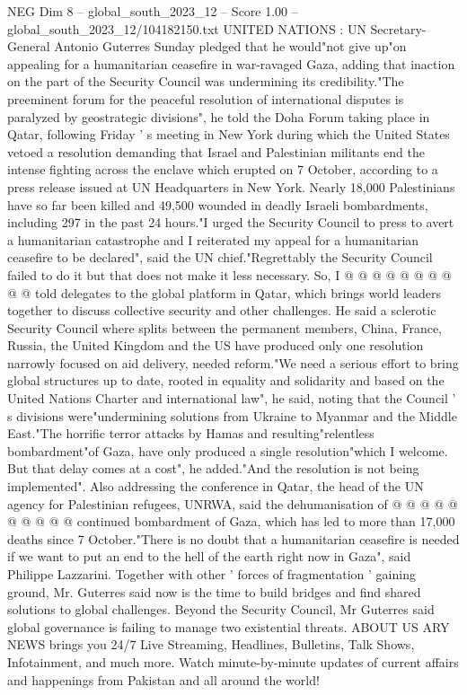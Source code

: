 \begin{textsample}{NEG Dim 8 – global\_south\_2023\_12 – Score 1.00 – global\_south\_2023\_12/104182150.txt}  \label{ex:f8_neg_229}
UNITED NATIONS : UN Secretary-General Antonio Guterres Sunday pledged that he would"not give up"on appealing for a humanitarian ceasefire in war-ravaged Gaza, adding that inaction on the part of the Security Council was undermining its credibility."The preeminent forum for the peaceful resolution of international disputes is paralyzed by geostrategic divisions", he told the Doha Forum taking place in Qatar, following Friday ' s meeting in New York during which the United States vetoed a resolution demanding that Israel and Palestinian militants end the intense fighting across the enclave which erupted on 7 October, according to a press release issued at UN Headquarters in New York.
Nearly 18,000 Palestinians have so far been killed and 49,500 wounded in deadly Israeli bombardments, including 297 in the past 24 hours."I urged the Security Council to press to avert a humanitarian catastrophe and I reiterated my appeal for a humanitarian ceasefire to be declared", said the UN chief."Regrettably the Security Council failed to do it but that does not make it less necessary.
So, I @ @ @ @ @ @ @ @ @ @ told delegates to the global platform in Qatar, which brings world leaders together to discuss collective security and other challenges.
He said a sclerotic Security Council where splits between the permanent members, China, France, Russia, the United Kingdom and the US have produced only one resolution narrowly focused on aid delivery, needed reform."We need a serious effort to bring global structures up to date, rooted in equality and solidarity and based on the United Nations Charter and international law", he said, noting that the Council ' s divisions were"undermining solutions from Ukraine to Myanmar and the Middle East."The horrific terror attacks by Hamas and resulting"relentless bombardment"of Gaza, have only produced a single resolution"which I welcome.
But that delay comes at a cost", he added."And the resolution is not being implemented".
Also addressing the conference in Qatar, the head of the UN agency for Palestinian refugees, UNRWA, said the dehumanisation of @ @ @ @ @ @ @ @ @ @ continued bombardment of Gaza, which has led to more than 17,000 deaths since 7 October."There is no doubt that a humanitarian ceasefire is needed if we want to put an end to the hell of the earth right now in Gaza", said Philippe Lazzarini.
Together with other ' forces of fragmentation ' gaining ground, Mr.
Guterres said now is the time to build bridges and find shared solutions to global challenges.
Beyond the Security Council, Mr Guterres said global governance is failing to manage two existential threats.
ABOUT US ARY NEWS brings you 24/7 Live Streaming, Headlines, Bulletins, Talk Shows, Infotainment, and much more.
Watch minute-by-minute updates of current affairs and happenings from Pakistan and all around the world!

\end{textsample}
